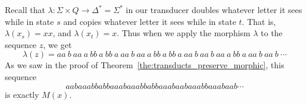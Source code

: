 \begin{example}[]
  Recall that $\lambda:\Sigma\times Q \to \Delta^* = \Sigma^*$ 
  in our transducer doubles whatever letter it sees while in state $s$ and copies whatever letter it sees while in state $t$.
  That is, $\lambda(x_s) = xx$, and $\lambda(x_t) = x$.
  Thus when we apply the morphism $\lambda$ to the sequence $z$, we get
  $$\lambda(z) = aa \ b \ aa \ a \ bb \ a \ bb \ a \ aa \ b \ aa \ a \ bb \ a \ bb \ a \ aa \ b \ aa \ b \ aa \ a \ bb \ a \ aa \ b \ aa \ b \  \cdots$$
  As we saw in the proof of Theorem~\ref{the:transducts_preserve_morphic}, this
  sequence 
  $$aa  b  aa  a  bb  a  bb  a  aa  b  aa  a  bb  a  bb  a  aa  b  aa  b  aa  a  bb  a  aa  b  aa  b   \cdots$$
  is exactly $M(x)$.  
\end{example}
